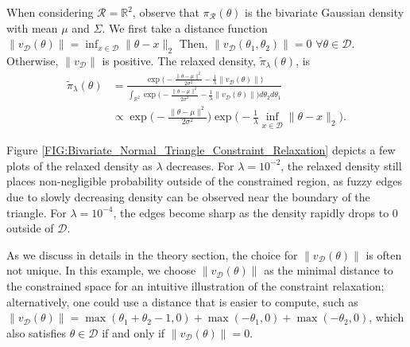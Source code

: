 \documentclass[10pt,fleqn]{article} \pdfoutput=1
\newcommand{\bb}[1]{\mathbb{#1}} \newcommand{\mc}[1]{\mathcal{#1}}
\DeclareMathOperator{\1}{\mathbbm{1}} \DeclareMathOperator{\bigO}{\mc O}
\begin{document}
When considering $\mc R=\bb R^2$, observe that $\pi_{\mc R}(\theta)$ is the
bivariate Gaussian density with mean $\mu$ and $\Sigma$. We first take a
distance function 
$\|v_{\mc D}(\theta)\| =
\inf_{x\in\mathcal{D}} \|\theta-x\|_2
$
Then, $\|v_{\mc D}(\theta_1,\theta_2)\| = 0$ $\forall \theta\in\mathcal{D}$.
Otherwise, $\|v_{\mc D}\|$ is positive. The relaxed density,
$\tilde{\pi}_\lambda(\theta)$, is \begin{equation} \begin{split}
\tilde{\pi}_\lambda(\theta)
&=\frac{\exp\bigg(-\frac{\|\theta-\mu\|^2}{2\sigma^2} -
\frac{1}{\lambda} \| v_{\mc D}(\theta)\|
\bigg)}{\int_{\mathbb{R}^2}
\exp\bigg(-\frac{\|\theta-\mu\|^2}{2\sigma^2}-\frac{1}{\lambda}\|v_{\mc
D}(\theta)\|
\bigg)d\theta_2d\theta_1}\\ & \propto
\exp\bigg(-\frac{\|\theta-\mu\|^2}{2\sigma^2}\bigg)\exp\bigg(
- \frac{1}{\lambda}\inf_{x\in\mathcal{D}} \|\theta-x\|_2\bigg).  \end{split}
\label{EQ:Relaxed_Density_Bivariate_Normal_Triangle} \end{equation}

Figure \ref{FIG:Bivariate_Normal_Triangle_Constraint_Relaxation} depicts
a few plots of the relaxed density as $\lambda$ decreases.  For $\lambda=
10^{-2}$, the relaxed density still places non-negligible probability outside
of the constrained region, as fuzzy edges due to slowly decreasing density
can be observed near the boundary of the triangle. For $\lambda=10^{-4}$,
the edges become sharp as the density rapidly drops to $0$ outside of $\mc
D$. 

As we discuss in details in the theory section, the choice for
$\|v_{\mc D}(\theta)\|$ is often not unique. In this example, we choose $\|v_{\mc D}(\theta)\|$ as the minimal
distance to the constrained space for an intuitive illustration of the
constraint relaxation; alternatively, one could use a
distance that is easier to compute, such as $\|v_{\mc D}(\theta)\| =
\max(\theta_1+\theta_2 -1,0) + \max(-\theta_1,0) + \max(-\theta_2,0)$,
which also satisfies $\theta\in\mc D$ if and only if $\|v_{\mc
D}(\theta)\|=0$. 
\end{document}
